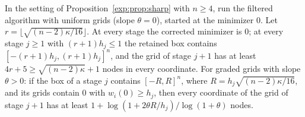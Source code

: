 \begin{corollary}
\label{exp:cor:uniform}
In the setting of Proposition~\ref{exp:prop:sharp} with $n\ge4$, run the
filtered algorithm with uniform grids (slope $\theta=0$), started at the
minimizer $0$. Let $r=\lfloor\sqrt{(n-2)\kappa/16}\rfloor$. At every stage the
corrected minimizer is $0$; at every stage $j\ge1$ with $(r+1)h_j\le1$ the
retained box contains $[-(r+1)h_j,(r+1)h_j]^n$, and the grid of stage $j+1$
has at least $4r+5\ge\sqrt{(n-2)\kappa}+1$ nodes in every coordinate. For
graded grids with slope $\theta>0$: if the box of a stage $j$ contains
$[-R,R]^n$, where $R=h_j\sqrt{(n-2)\kappa/16}$, and its grids contain $0$
with $w_i(0)\ge h_j$, then every coordinate of the grid of stage $j+1$ has
at least $1+\log(1+2\theta R/h_j)/\log(1+\theta)$ nodes.
\end{corollary}

